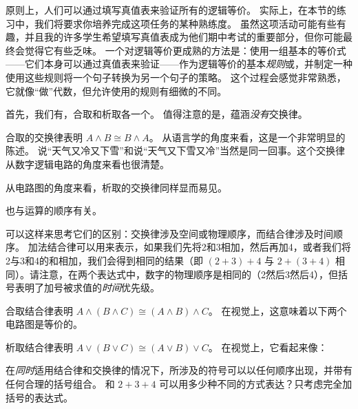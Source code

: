 原则上，人们可以通过填写真值表来验证所有的逻辑等价。
实际上，在本节的练习中，我们将要求你培养完成这项任务的某种熟练度。
虽然这项活动可能有些有趣，并且我的许多学生希望填写真值表成为他们期中考试的重要部分，但你可能最终会觉得它有些乏味。
一个对逻辑等价更成熟的方法是：使用一组基本的等价式——它们本身可以通过真值表来验证——作为逻辑等价的基本{\em 规则}或，并制定一种使用这些规则将一个句子转换为另一个句子的策略。
这个过程会感觉非常熟悉，它就像“做”代数，但允许使用的规则有细微的不同。

首先，我们有，合取和析取各一个。
值得注意的是，蕴涵{\em 没有}交换律。

合取的交换律表明 $A \land B \cong B \land A$。
从语言学的角度来看，这是一个非常明显的陈述。
说“天气又冷又下雪”和说“天气又下雪又冷”当然是同一回事。这个交换律从数字逻辑电路的角度来看也很清楚。

\begin{center}

\end{center}   
  
从电路图的角度来看，析取的交换律同样显而易见。

\begin{center}

\end{center}   

也与运算的顺序有关。

可以这样来思考它们的区别：交换律涉及空间或物理顺序，而结合律涉及时间顺序。
加法结合律可以用来表示，如果我们先将2和3相加，然后再加4，或者我们将2与3和4的和相加，我们会得到相同的结果（即 $(2+3)+4$ 与 $2+(3+4)$ 相同）。请注意，在两个表达式中，数字的物理顺序是相同的（2然后3然后4），但括号表明了加号被求值的{\em 时间}优先级。

合取结合律表明 $A \land (B \land C) \cong (A \land B) \land C$。
在视觉上，这意味着以下两个电路图是等价的。

\begin{center}

\end{center}   

析取结合律表明 $A \lor (B \lor C) \cong (A \lor B) \lor C$。
在视觉上，它看起来像：

\begin{center}

\end{center}   

\begin{exer}
在{\em 同时}适用结合律和交换律的情况下，所涉及的符号可以以任何顺序出现，并带有任何合理的括号组合。
和 $2+3+4$ 可以用多少种不同的方式表达？只考虑完全加括号的表达式。
\end{exer}

